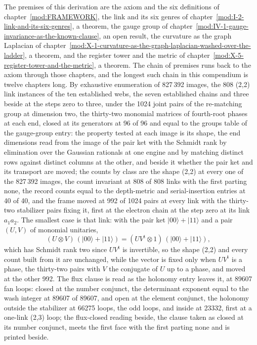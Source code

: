 \begin{chproof}
The premises of this derivation are the axiom and the six definitions of chapter~\ref{mod:FRAMEWORK}, the link and its six genres of chapter~\ref{mod:I-2-link-and-its-six-genres}, a theorem, the gauge group of chapter~\ref{mod:IV-1-gauge-invariance-as-the-known-clause}, an open result, the curvature as the graph Laplacian of chapter~\ref{mod:X-1-curvature-as-the-graph-laplacian-washed-over-the-ladder}, a theorem, and the register tower and the metric of chapter~\ref{mod:X-5-register-tower-and-the-metric}, a theorem. The chain of premises runs back to the axiom through those chapters, and the longest such chain in this compendium is twelve chapters long.
By exhaustive enumeration of 827\,392 images, the 808 (2,2) link instances of the ten established webs, the seven established chains and three beside at the steps zero to three, under the 1024 joint pairs of the re-matching group at dimension two, the thirty-two monomial matrices of fourth-root phases at each end, closed at its generators at 96 of 96 and equal to the groups table of the gauge-group entry: the property tested at each image is its shape, the end dimensions read from the image of the pair ket with the Schmidt rank by elimination over the Gaussian rationals at one engine and by matching distinct rows against distinct columns at the other, and beside it whether the pair ket and its transport are moved; the counts by class are the shape (2,2) at every one of the 827\,392 images, the count invariant at 808 of 808 links with the first parting none, the record counts equal to the depth-metric and serial-insertion entries at 40 of 40, and the frame moved at 992 of 1024 pairs at every link with the thirty-two stabilizer pairs fixing it, first at the electron chain at the step zero at its link $a_{1}a_{2}$. The smallest case is that link: with the pair ket $\lvert 00\rangle + \lvert 11\rangle$ and a pair $(U, V)$ of monomial unitaries,
\begin{equation} (U \otimes V)\,(\lvert 00\rangle + \lvert 11\rangle) = (U V^{\mathrm{t}} \otimes 1)\,(\lvert 00\rangle + \lvert 11\rangle), \end{equation}
which has Schmidt rank two since $U V^{\mathrm{t}}$ is invertible, so the shape (2,2) and every count built from it are unchanged, while the vector is fixed only when $U V^{\mathrm{t}}$ is a phase, the thirty-two pairs with $V$ the conjugate of $U$ up to a phase, and moved at the other 992. The flux clause is read as the holonomy entry leaves it, at 89607 fan loops: closed at the number conjunct, the determinant exponent equal to the wash integer at 89607 of 89607, and open at the element conjunct, the holonomy outside the stabilizer at 66275 loops, the odd loops, and inside at 23332, first at a one-link (2,3) loop; the flux-closed reading beside, the clause taken as closed at its number conjunct, meets the first face with the first parting none and is printed beside.

\end{chproof}
